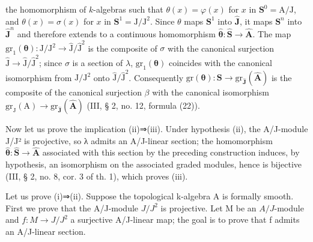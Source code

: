 the homomorphism of \(k\)-algebras such that \(\theta(x) = \varphi(x)\) for \(x\) in \(\mathbf{S}^0 = \mathrm{A}/\mathrm{J}\), and \(\theta(x) = \sigma(x)\) for \(x\) in \(\mathbf{S}^1 = \mathrm{J}/\mathrm{J}^2\). Since \(\theta\) maps \(\mathbf{S}^1\) into \(\widehat{\mathbf{J}}\), it maps \(\mathbf{S}^n\) into \(\widehat{\mathbf{J}}^n\) and therefore extends to a continuous homomorphism \(\widehat{\boldsymbol{\theta}}: \widehat{\mathbf{S}} \to \widehat{\mathbf{A}}\). The map \(\mathrm{gr}_1(\boldsymbol{\theta}): \mathrm{J}/\mathrm{J}^2 \longrightarrow \widehat{\mathrm{J}}/\widehat{\mathrm{J}}^2\) is the composite of \(\sigma\) with the canonical surjection \(\widehat{\mathrm{J}} \longrightarrow \widehat{\mathrm{J}}/\widehat{\mathrm{J}}^2\); since \(\sigma\) is a section of \(\lambda\), \(\mathrm{gr}_1(\boldsymbol{\theta})\) coincides with the canonical isomorphism from \(\mathrm{J}/\mathrm{J}^2\) onto \(\widehat{\mathrm{J}}/\widehat{\mathrm{J}}^2\). Consequently \(\mathrm{gr}(\boldsymbol{\theta}): \mathbf{S} \to \mathrm{gr}_{\widehat{\mathbf{J}}}(\widehat{\mathbf{A}})\) is the composite of the canonical surjection \(\beta\) with the canonical isomorphism \(\mathrm{gr}_\mathrm{J}(\mathrm{A}) \to \mathrm{gr}_{\widehat{\mathbf{J}}}(\widehat{\mathbf{A}})\) (III, § 2, no. 12, formula (22)).

Now let us prove the implication (ii)⇒(iii). Under hypothesis (ii), the A/J-module J/J² is projective, so λ admits an A/J-linear section; the homomorphism \(\widehat{\boldsymbol{\theta}}:\widehat{\mathbf{S}}\to\widehat{\mathbf{A}}\) associated with this section by the preceding construction induces, by hypothesis, an isomorphism on the associated graded modules, hence is bijective (III, § 2, no. 8, cor. 3 of th. 1), which proves (iii).

Let us prove (i)⇒(ii). Suppose the topological k-algebra A is formally smooth. First we prove that the A/J-module \(J/J^{2}\) is projective. Let M be an \(A/J\)-module and \(f:M\to J/J^{2}\) a surjective A/J-linear map; the goal is to prove that f admits an A/J-linear section.

